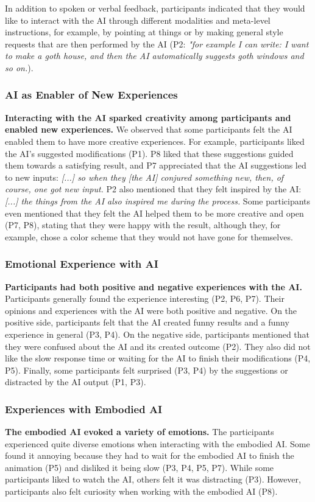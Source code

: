 In addition to spoken or verbal feedback, participants indicated that they would like to interact with the AI through different modalities and meta-level instructions, for example, by pointing at things or by making general style requests that are then performed by the AI (P2: \textit{"for example I can write: I want to make a goth house, and then the AI automatically suggests goth windows and so on.}).


\subsubsection{AI as Enabler of New Experiences}
\textbf{Interacting with the AI sparked creativity among participants and enabled new experiences.}
We observed that some participants felt the AI enabled them to have more creative experiences. For example, participants liked the AI's suggested modifications (P1). P8 liked that these suggestions guided them towards a satisfying result, and P7 appreciated that the AI suggestions led to new inputs: \textit{[...] so when they [the AI] conjured something new, then, of course, one got new input.} P2 also mentioned that they felt inspired by the AI: \textit{[...] the things from the AI also inspired me during the process.} Some participants even mentioned that they felt the AI helped them to be more creative and open (P7, P8), stating that they were happy with the result, although they, for example, chose a color scheme that they would not have gone for themselves. %

\subsubsection{Emotional Experience with AI} %
\textbf{Participants had both positive and negative experiences with the AI.}
Participants generally found the experience interesting (P2, P6, P7).
Their opinions and experiences with the AI were both positive and negative. On the positive side, participants felt that the AI created funny results and a funny experience in general (P3, P4). On the negative side, participants mentioned that they were confused about the AI and its created outcome (P2). They also did not like the slow response time or waiting for the AI to finish their modifications (P4, P5). Finally, some participants felt surprised (P3, P4) by the suggestions or distracted by the AI output (P1, P3).

\subsubsection{Experiences with Embodied AI}
\textbf{The embodied AI evoked a variety of emotions.}
The participants experienced quite diverse emotions when interacting with the embodied AI. Some found it annoying because they had to wait for the embodied AI to finish the animation (P5) and disliked it being slow (P3, P4, P5, P7). While some participants liked to watch the AI, others felt it was distracting (P3). However, participants also felt curiosity when working with the embodied AI (P8). 

